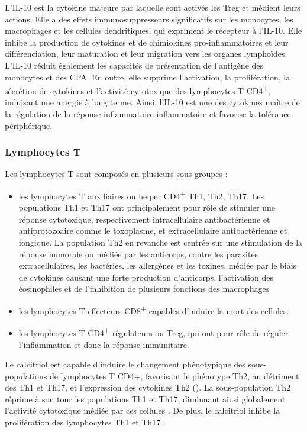 \documentclass[
  a4paper,
  DIV=11,
  numbers=noendperiod,
  listof=totoc]{scrreprt}
\begin{document}
L'IL-10 est la cytokine majeure par laquelle sont activés les \ac{Treg}
et médient leurs actions. Elle a des effets immunosuppresseurs
significatifs sur les monocytes, les macrophages et les cellules
dendritiques, qui expriment le récepteur à l'IL-10. Elle inhibe la
production de cytokines et de chimiokines pro-inflammatoires et leur
différenciation, leur maturation et leur migration vers les organes
lymphoïdes. L'IL-10 réduit également les capacités de présentation de
l'antigène des monocytes et des \ac{CPA}. En outre, elle supprime
l'activation, la prolifération, la sécrétion de cytokines et l'activité
cytotoxique des lymphocytes T CD4\textsuperscript{+}, induisant une
anergie à long terme. Ainsi, l'IL-10 est une des cytokines maître de la
régulation de la réponse inflammatoire inflammatoire et favorise la
tolérance périphérique.

\subsubsection{Lymphocytes T}\label{lymphocytes-t}

Les lymphocytes T sont composés en plusieurs sous-groupes :

\begin{itemize}
\item
  les lymphocytes T auxiliaires ou helper CD4\textsuperscript{+} Th1,
  Th2, Th17. Les populations \ac{Th1} et \ac{Th17} ont principalement
  pour rôle de stimuler une réponse cytotoxique, respectivement
  intracellulaire antibactérienne et antiprotozoaire comme le
  toxoplasme, et extracellulaire antibactérienne et fongique. La
  population \ac{Th2} en revanche est centrée sur une stimulation de la
  réponse humorale ou médiée par les anticorps, contre les parasites
  extracellulaires, les bactéries, les allergènes et les toxines, médiée
  par le biais de cytokines causant une forte production d'anticorps,
  l'activation des éosinophiles et de l'inhibition de plusieurs
  fonctions des macrophages \autocite{Cantorna.2015,Walker.2018}
\item
  les lymphocytes T effecteurs CD8\textsuperscript{+} capables d'induire
  la mort des cellules.
\item
  les lymphocytes T CD4\textsuperscript{+} régulateurs ou \ac{Treg}, qui
  ont pour rôle de réguler l'inflammation et donc la réponse
  immunitaire.
\end{itemize}

Le calcitriol est capable d'induire le changement phénotypique des
sous-populations de lymphocytes T CD4+, favorisant le phénotype Th2, au
détriment des \ac{Th1} et \ac{Th17}, et l'expression des cytokines
\ac{Th2} (). La sous-population \ac{Th2} réprime à
son tour les populations \ac{Th1} et \ac{Th17}, diminuant ainsi
globalement l'activité cytotoxique médiée par ces cellules
\autocite{Meza-Meza.2022}. De plus, le calcitriol inhibe la
prolifération des lymphocytes Th1 et Th17 \autocite{Cantorna.2015}.
\end{document}
